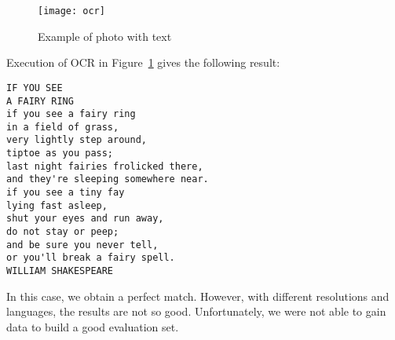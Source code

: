 \begin{figure}[H]
\centering
\texttt{[image: ocr]}
\caption{Example of photo with text}
\label{testOCR}
\end{figure}

Execution of OCR in Figure~\ref{testOCR} gives the following result:
\begin{lstlisting}
IF YOU SEE
A FAIRY RING
if you see a fairy ring
in a field of grass,
very lightly step around,
tiptoe as you pass;
last night fairies frolicked there,
and they're sleeping somewhere near.
if you see a tiny fay
lying fast asleep,
shut your eyes and run away,
do not stay or peep;
and be sure you never tell,
or you'll break a fairy spell.
WILLIAM SHAKESPEARE
\end{lstlisting}

In this case, we obtain a perfect match. However, with different resolutions and languages, the results are not so good. Unfortunately, we were not able to gain data to build a good evaluation set.